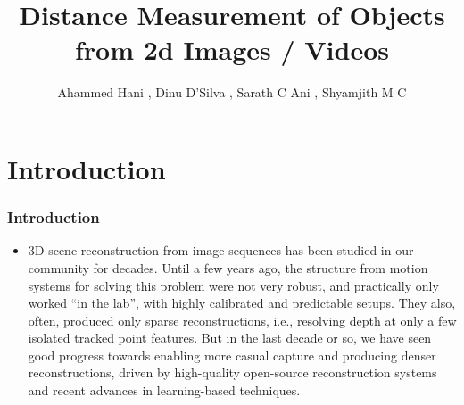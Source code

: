 \documentclass{beamer}
\title{Distance Measurement of Objects from 2d Images / Videos}
\author{Ahammed Hani , Dinu D'Silva , Sarath C Ani , Shyamjith M C}
\begin{document}
	
	\maketitle
	
	\section{Introduction}
	\begin{frame}
	\frametitle{Introduction}
	
	\begin{itemize}
		\item 3D scene reconstruction from image sequences has been studied
		in our community for decades. Until a few years ago, the structure
		from motion systems for solving this problem were not very robust,
		and practically only worked “in the lab”, with highly calibrated and
		predictable setups. They also, often, produced only sparse reconstructions, i.e., resolving depth at only a few isolated tracked point
		features. But in the last decade or so, we have seen good progress
		towards enabling more casual capture and producing denser reconstructions, driven by high-quality open-source reconstruction
		systems and recent advances in learning-based techniques.
	\end{itemize}
	
	\end{frame}
	
	
\end{document}
